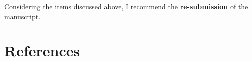 \documentclass[11pt]{article}
\begin{document}
Considering the items discussed above, I recommend the \textbf{re-submission} of the manuscript.

\section*{References}
\label{sec:orgfad488a}
\printbibliography[heading=none]
\end{document}
